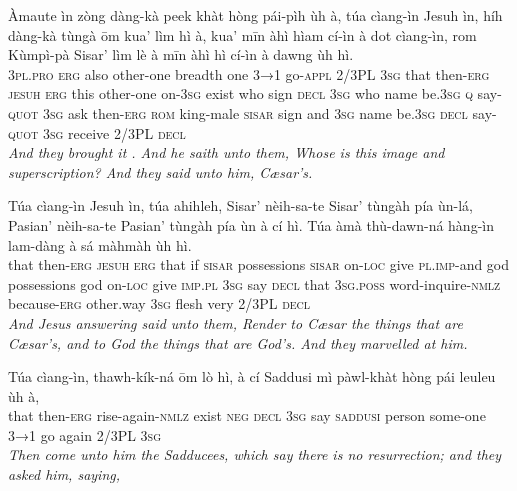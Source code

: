 \documentclass[11pt,a4paper]{article}
\begin{document}
\begin{exe}
\gll Àmaute ìn zòng dàng-kà peek khàt hòng pái-pìh ùh à, túa cìang-ìn Jesuh ìn, híh dàng-kà tùngà ōm kua' lìm hì à, kua' mīn àhì hìam cí-ìn à dot cìang-ìn, rom Kùmpì-pà Sisar' lìm lè à mīn àhì hì cí-ìn à dawng ùh hì. \\
     \textsc{3pl}.\textsc{pro} \textsc{erg} also other-one breadth one \textsc{3→1} go-\textsc{appl} 2/3PL \textsc{3sg} that then-\textsc{erg} \textsc{jesuh} \textsc{erg} this other-one on-\textsc{3sg} exist who sign \textsc{decl} \textsc{3sg} who name be.\textsc{3sg} \textsc{q} say-\textsc{quot} \textsc{3sg} ask then-\textsc{erg} \textsc{rom} king-male \textsc{sisar} sign and \textsc{3sg} name be.\textsc{3sg} \textsc{decl} say-\textsc{quot} \textsc{3sg} receive 2/3PL \textsc{decl} \\
\glt \textcolor{kjvcolor}{\textit{And they brought it . And he saith unto them, Whose is this image and superscription? And they said unto him, Cæsar's.}}

\gll Túa cìang-ìn Jesuh ìn, túa ahihleh, Sisar' nèih-sa-te Sisar' tùngàh pía ùn-lá, Pasian' nèih-sa-te Pasian' tùngàh pía ùn à cí hì. Túa àmà thù-dawn-ná hàng-ìn lam-dàng à sá màhmàh ùh hì. \\
     that then-\textsc{erg} \textsc{jesuh} \textsc{erg} that if \textsc{sisar} possessions \textsc{sisar} on-\textsc{loc} give \textsc{pl}.\textsc{imp}-and god possessions god on-\textsc{loc} give \textsc{imp}.\textsc{pl} \textsc{3sg} say \textsc{decl} that \textsc{3sg}.\textsc{poss} word-inquire-\textsc{nmlz} because-\textsc{erg} other.way \textsc{3sg} flesh very 2/3PL \textsc{decl} \\
\glt \textcolor{kjvcolor}{\textit{And Jesus answering said unto them, Render to Cæsar the things that are Cæsar's, and to God the things that are God's. And they marvelled at him.}}

\gll Túa cìang-ìn, thawh-kík-ná ōm lò hì, à cí Saddusi mì pàwl-khàt hòng pái leuleu ùh à, \\
     that then-\textsc{erg} rise-again-\textsc{nmlz} exist \textsc{neg} \textsc{decl} \textsc{3sg} say \textsc{saddusi} person some-one \textsc{3→1} go again 2/3PL \textsc{3sg} \\
\glt \textcolor{kjvcolor}{\textit{Then come unto him the Sadducees, which say there is no resurrection; and they asked him, saying,}}


\end{exe}
\end{document}
